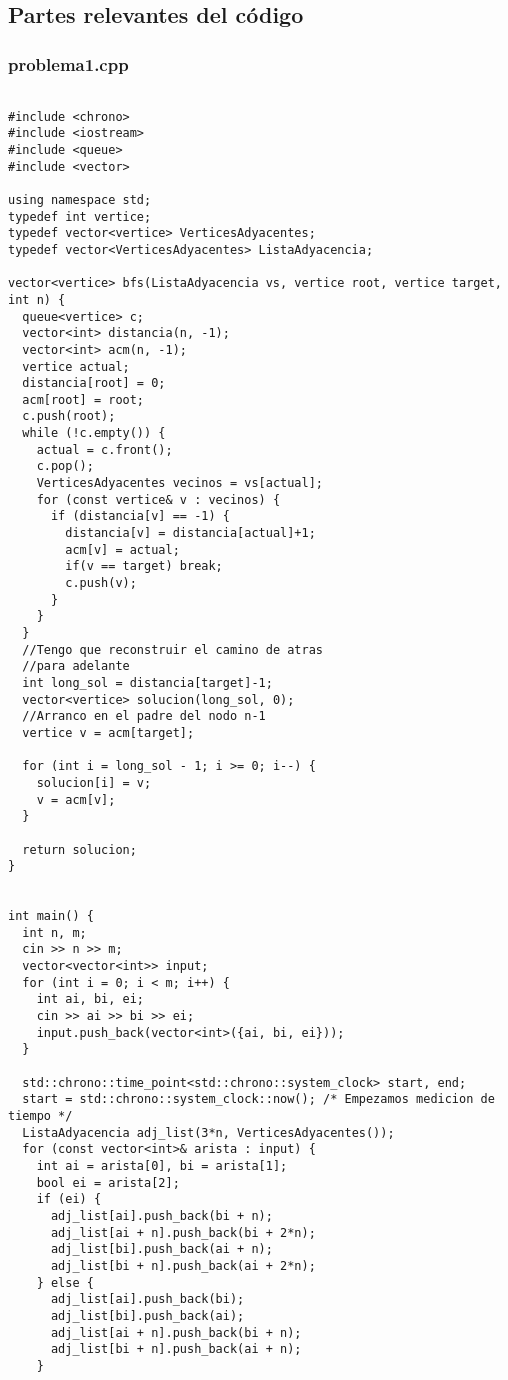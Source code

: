 \subsection{Partes relevantes del código}
\lstset{language=C++, breaklines=true, basicstyle=\footnotesize}
\lstset{numbers=left, numberstyle=\tiny, stepnumber=1, numbersep=5pt, tabsize=2}

\subsubsection{problema1.cpp}
\begin{lstlisting}[frame=single]

#include <chrono>
#include <iostream>
#include <queue>
#include <vector>

using namespace std;
typedef int vertice;
typedef vector<vertice> VerticesAdyacentes;
typedef vector<VerticesAdyacentes> ListaAdyacencia;

vector<vertice> bfs(ListaAdyacencia vs, vertice root, vertice target, int n) {
  queue<vertice> c;
  vector<int> distancia(n, -1); 
  vector<int> acm(n, -1);
  vertice actual;
  distancia[root] = 0;
  acm[root] = root;
  c.push(root);
  while (!c.empty()) {
    actual = c.front();   
    c.pop();
    VerticesAdyacentes vecinos = vs[actual];
    for (const vertice& v : vecinos) {
      if (distancia[v] == -1) {
        distancia[v] = distancia[actual]+1;
        acm[v] = actual;
        if(v == target) break;
        c.push(v);
      }
    }
  }
  //Tengo que reconstruir el camino de atras 
  //para adelante
  int long_sol = distancia[target]-1;
  vector<vertice> solucion(long_sol, 0);
  //Arranco en el padre del nodo n-1
  vertice v = acm[target];

  for (int i = long_sol - 1; i >= 0; i--) {
    solucion[i] = v;
    v = acm[v];
  }

  return solucion;
}


int main() {
  int n, m;
  cin >> n >> m;
  vector<vector<int>> input;
  for (int i = 0; i < m; i++) {
    int ai, bi, ei;
    cin >> ai >> bi >> ei;
    input.push_back(vector<int>({ai, bi, ei}));
  }

  std::chrono::time_point<std::chrono::system_clock> start, end;
  start = std::chrono::system_clock::now(); /* Empezamos medicion de tiempo */
  ListaAdyacencia adj_list(3*n, VerticesAdyacentes());
  for (const vector<int>& arista : input) {
    int ai = arista[0], bi = arista[1];
    bool ei = arista[2];
    if (ei) {
      adj_list[ai].push_back(bi + n);
      adj_list[ai + n].push_back(bi + 2*n);
      adj_list[bi].push_back(ai + n);
      adj_list[bi + n].push_back(ai + 2*n);
    } else {
      adj_list[ai].push_back(bi);
      adj_list[bi].push_back(ai);
      adj_list[ai + n].push_back(bi + n);
      adj_list[bi + n].push_back(ai + n);
    }


\end{lstlisting}

